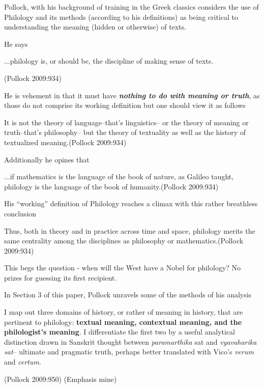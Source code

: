 Pollock, with his background of training in the Greek classics considers the use of Philology and its methods (according to his definitions) as being critical to understanding the meaning (hidden or otherwise) of texts.

He says 
\begin{myquote}
...philology is, or should be, the discipline of making sense of texts.

\hfill (Pollock 2009:934)
\end{myquote}

He is vehement in that it must have {{\sl\bfseries nothing to do with meaning or truth}\relax}, as those do not comprise its working definition but one should view it as follows
\begin{myquote}
It is not the theory of language--that's linguistics-- or the theory of meaning or truth--that's philosophy-- but the theory of textuality as well as the history of textualized meaning.\hfill (Pollock 2009:934)
\end{myquote}

Additionally he opines that
\begin{myquote}
...if mathematics is the language of the book of nature, as Galileo taught, philology is the language of the book of humanity.\hfill (Pollock 2009:934)
\end{myquote}

His ``working'' definition of Philology reaches a climax with this rather breathless conclusion
\begin{myquote}
Thus, both in theory and in practice across time and space, philology merits the same centrality among the disciplines as philosophy or mathematics.\hfill (Pollock 2009:934)
\end{myquote}

This begs the question - when will the West have a Nobel for philology? No prizes for guessing its first recipient.

In Section 3 of this paper, Pollock unravels some of the methods of his analysis
\begin{myquote}
I map out three domains of history, or rather of meaning in history, that are pertinent to philology: {\bf textual meaning, contextual meaning, and the philologist's meaning}. I differentiate the first two by a useful analytical distinction drawn in Sanskrit thought between {\sl paramarthika} sat and {\sl vyavaharika sat}-- ultimate and pragmatic truth, perhaps better translated with Vico's {\sl verum} and {\sl certum}.

\hfill (Pollock 2009:950) (Emphasis mine)
\end{myquote}

